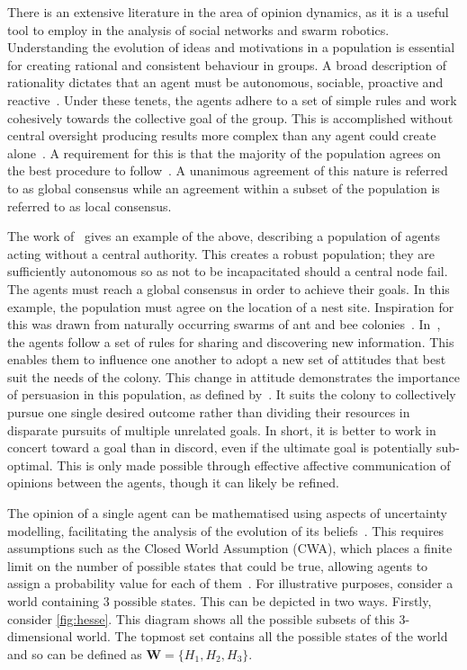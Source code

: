 There is an extensive literature in the area of opinion dynamics, as it is a useful tool to employ in the analysis of social networks and swarm robotics. Understanding the evolution of ideas and motivations in a population is essential for creating rational and consistent behaviour in groups. A broad description of rationality dictates that an agent must be autonomous, sociable, proactive and reactive~\cite{Genesereth1994SoftwareAgents, Castelfranchi1995GuaranteesArchitecture}. Under these tenets, the agents adhere to a set of simple rules and work cohesively towards the collective goal of the group. This is accomplished without central oversight producing results more complex than any agent could create alone~\cite{Rawls1971AJustice}. A requirement for this is that the majority of the population agrees on the best procedure to follow~\cite{Baronchelli2018ThePrimer}. A unanimous agreement of this nature is referred to as global consensus while an agreement within a subset of the population is referred to as local consensus.


The work of~\cite{Parker2009CooperativeProblem} gives an example of the above, describing a population of agents acting without a central authority. This creates a robust population; they are sufficiently autonomous so as not to be incapacitated should a central node fail. The agents must reach a global consensus in order to achieve their goals. In this example, the population must agree on the location of a nest site. Inspiration for this was drawn from naturally occurring swarms of ant and bee colonies~\cite{Pratt2005BehavioralCurvispinosus, List2009IndependenceSwarms}. In~\cite{Parker2009CooperativeProblem}, the agents follow a set of rules for sharing and discovering new information. This enables them to influence one another to adopt a new set of attitudes that best suit the needs of the colony. This change in attitude demonstrates the importance of persuasion in this population, as defined by~\cite{Petty1986CommunicationChange}. It suits the colony to collectively pursue one single desired outcome rather than dividing their resources in disparate pursuits of multiple unrelated goals. In short, it is better to work in concert toward a goal than in discord, even if the ultimate goal is potentially sub-optimal. This is only made possible through effective affective communication of opinions between the agents, though it can likely be refined. 

The opinion of a single agent can be mathematised using aspects of uncertainty modelling, facilitating the analysis of the evolution of its beliefs~\cite{Wooldridge1995IntelligentPractice}. This requires assumptions such as the Closed World Assumption (CWA), which places a finite limit on the number of possible states that could be true, allowing agents to assign a probability value for each of them~\cite{Jsang2001APROBABILITIES}. For illustrative purposes, consider a world containing $3$ possible states. This can be depicted in two ways. Firstly, consider \cref{fig:hesse}. This diagram shows all the possible subsets of this $3$-dimensional world. The topmost set contains all the possible states of the world and so can be defined as $\mathbf{W} = \{ H_1, H_2, H_3\}$. 

